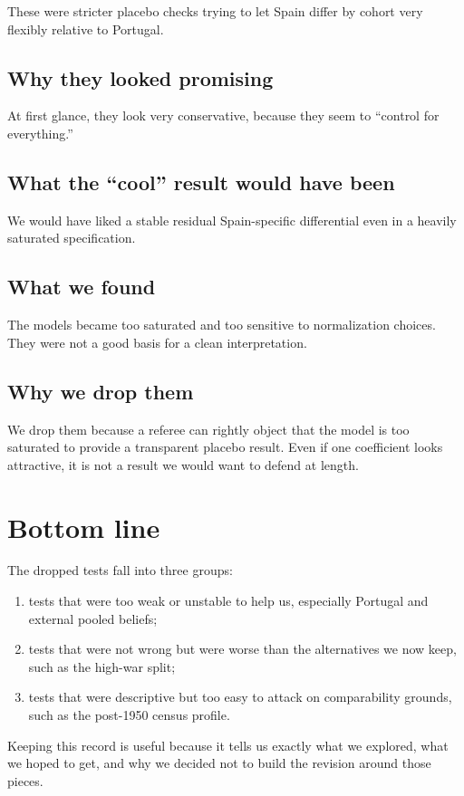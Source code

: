 \documentclass[11pt]{article}
\begin{document}
These were stricter placebo checks trying to let Spain differ by cohort very flexibly relative to Portugal.

\subsection*{Why they looked promising}

At first glance, they look very conservative, because they seem to ``control for everything.''

\subsection*{What the ``cool'' result would have been}

We would have liked a stable residual Spain-specific differential even in a heavily saturated specification.

\subsection*{What we found}

The models became too saturated and too sensitive to normalization choices. They were not a good basis for a clean interpretation.

\subsection*{Why we drop them}

We drop them because a referee can rightly object that the model is too saturated to provide a transparent placebo result. Even if one coefficient looks attractive, it is not a result we would want to defend at length.

\section*{Bottom line}

The dropped tests fall into three groups:
\begin{enumerate}[leftmargin=*]
\item tests that were too weak or unstable to help us, especially Portugal and external pooled beliefs;
\item tests that were not wrong but were worse than the alternatives we now keep, such as the high-war split;
\item tests that were descriptive but too easy to attack on comparability grounds, such as the post-1950 census profile.
\end{enumerate}

Keeping this record is useful because it tells us exactly what we explored, what we hoped to get, and why we decided not to build the revision around those pieces.
\end{document}
